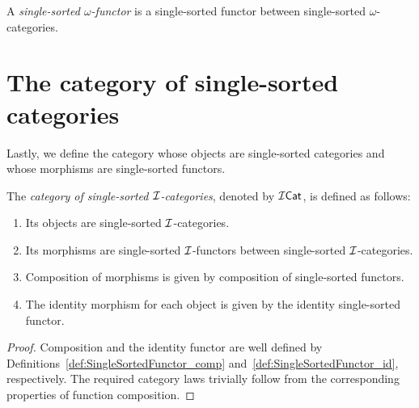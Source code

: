 \begin{definition}
  \label{def:SingleSortedOmegaFunctor}
  \leanok
  A \emph{single-sorted $\omega$-functor} is a single-sorted functor between single-sorted
  $\omega$-categories.
\end{definition}

\section{The category of single-sorted categories}

Lastly, we define the category whose objects are single-sorted categories and whose morphisms are
single-sorted functors.

\begin{construction}
  \label{def:SingleSortedCategory_category}
  \leanok
  The \emph{category of single-sorted $\mathcal{I}$-categories}, denoted by $\mathcal{I}\mathsf{Cat}$, is defined as
  follows:

  \begin{enumerate}
    \item \label{ax:ss_cat_obj} Its objects are single-sorted $\mathcal{I}$-categories.
    \item \label{ax:ss_cat_mor} Its morphisms are single-sorted $\mathcal{I}$-functors between
      single-sorted $\mathcal{I}$-categories.
    \item \label{ax:ss_cat_comp} Composition of morphisms is given by composition of single-sorted
      functors.
    \item \label{ax:ss_cat_id} The identity morphism for each object is given by the identity
      single-sorted functor.
  \end{enumerate}
\end{construction}

\begin{proof}
  \leanok
  Composition and the identity functor are well defined by
  Definitions~\ref{def:SingleSortedFunctor_comp} and~\ref{def:SingleSortedFunctor_id}, respectively.
  The required category laws trivially follow from the corresponding properties of function
  composition.
\end{proof}

